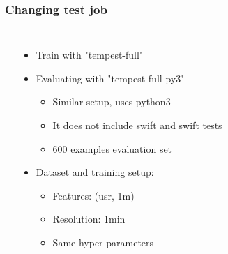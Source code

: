 \documentclass[aspectratio=169,11pt,hyperref={colorlinks=true}]{beamer}
\begin{document}
\begin{frame}
    \frametitle{Changing test job}
    \begin{columns}
        \begin{table}[h!]
          \begin{center}
            \label{binary_eval_compare}
          \end{center}
       \end{table}
        \begin{itemize}
            \item{Train with "tempest-full"}
            \item{Evaluating with "tempest-full-py3"}
            \begin{itemize}
              \item{Similar setup, uses python3}
              \item{It does not include swift and swift tests}
              \item{600 examples evaluation set}
            \end{itemize}
            \item{Dataset and training setup:}
            \begin{itemize}
              \item{Features: (usr, 1m)}
              \item{Resolution: 1min}
              \item{Same hyper-parameters}
            \end{itemize}
        \end{itemize}
    \end{columns}
\end{frame}
\end{document}
